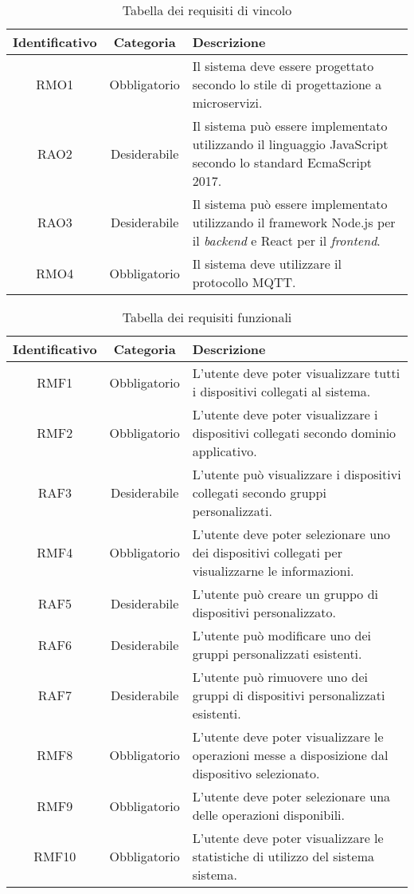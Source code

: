 

\begin{table}[H]
\caption{Tabella dei requisiti di vincolo}
\label{tab:requisiti-vincolo}
\begin{tabularx}{\linewidth}{|c|c|X|}
\hline
\textbf{Identificativo} & \textbf{Categoria} & \textbf{Descrizione} \\
\hline
RMO1 & Obbligatorio & Il sistema deve essere progettato secondo lo stile di progettazione a microservizi. \\
\hline
RAO2 & Desiderabile & Il sistema può essere implementato utilizzando il linguaggio JavaScript secondo lo standard EcmaScript 2017. \\
\hline
RAO3 & Desiderabile & Il sistema può essere implementato utilizzando il framework Node.js per il \emph{backend} e React per il \emph{frontend}. \\
\hline
RMO4 & Obbligatorio & Il sistema deve utilizzare il protocollo MQTT. \\
\hline
\end{tabularx}
\end{table}


\begin{table}[H]
\caption{Tabella dei requisiti funzionali}
\label{tab:requisiti-funzionali}
\begin{tabularx}{\linewidth}{|c|c|X|}
\hline
\textbf{Identificativo} & \textbf{Categoria} & \textbf{Descrizione} \\
\hline
RMF1 & Obbligatorio & L'utente deve poter visualizzare tutti i dispositivi collegati al sistema. \\
\hline
RMF2 & Obbligatorio & L'utente deve poter visualizzare i dispositivi collegati secondo dominio applicativo. \\
\hline
RAF3 & Desiderabile & L'utente può visualizzare i dispositivi collegati secondo gruppi personalizzati. \\
\hline
RMF4 & Obbligatorio & L'utente deve poter selezionare uno dei dispositivi collegati per visualizzarne le informazioni. \\
\hline
RAF5 & Desiderabile & L'utente può creare un gruppo di dispositivi personalizzato. \\
\hline
RAF6 & Desiderabile & L'utente può modificare uno dei gruppi personalizzati esistenti. \\
\hline
RAF7 & Desiderabile & L'utente può rimuovere uno dei gruppi di dispositivi personalizzati esistenti. \\
\hline
RMF8 & Obbligatorio & L'utente deve poter visualizzare le operazioni messe a disposizione dal dispositivo selezionato. \\
\hline
RMF9 & Obbligatorio & L'utente deve poter selezionare una delle operazioni disponibili. \\
\hline
RMF10 & Obbligatorio & L'utente deve poter visualizzare le statistiche di utilizzo del sistema sistema. \\
\hline
\end{tabularx}
\end{table}

